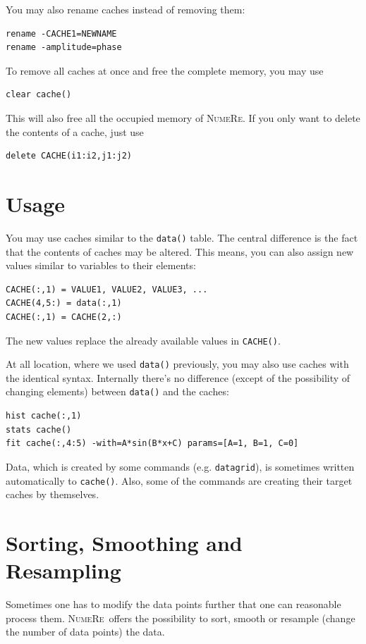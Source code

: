 \documentclass[DIV=14,headsepline,footsepline]{scrbook}
\newcommand{\NR}{\textsc{Nu\-me\-Re}}
\begin{document}
				You may also rename caches instead of removing them:
				\begin{lstlisting}
rename -CACHE1=NEWNAME
rename -amplitude=phase
				\end{lstlisting}
				
				To remove all caches at once and free the complete memory, you may use 
				\begin{lstlisting}
clear cache()
				\end{lstlisting}
				This will also free all the occupied memory of \NR. If you only want to delete the contents of a cache, just use 
				\begin{lstlisting}
delete CACHE(i1:i2,j1:j2)
				\end{lstlisting}
				
			\section{Usage}
				You may use caches similar to the \lstinline+data()+ table. The central difference is the fact that the contents of caches may be altered. This means, you can also assign new values similar to variables to their elements:
				\begin{lstlisting}
CACHE(:,1) = VALUE1, VALUE2, VALUE3, ...
CACHE(4,5:) = data(:,1)
CACHE(:,1) = CACHE(2,:)
				\end{lstlisting}
				The new values replace the already available values in \lstinline+CACHE()+.
				
				At all location, where we used \lstinline+data()+ previously, you may also use caches with the identical syntax. Internally there's no difference (except of the possibility of changing elements) between \lstinline+data()+ and the caches:
				\begin{lstlisting}
hist cache(:,1)
stats cache()
fit cache(:,4:5) -with=A*sin(B*x+C) params=[A=1, B=1, C=0]
				\end{lstlisting}
				
				Data, which is created by some commands (e.g. \lstinline+datagrid+), is sometimes written automatically to \lstinline+cache()+. Also, some of the commands are creating their target caches by themselves.
			\section{Sorting, Smoothing and Resampling}
				Sometimes one has to modify the data points further that one can reasonable process them. \NR\ offers the possibility to sort, smooth or resample (change the number of data points) the data.
				
\end{document}
